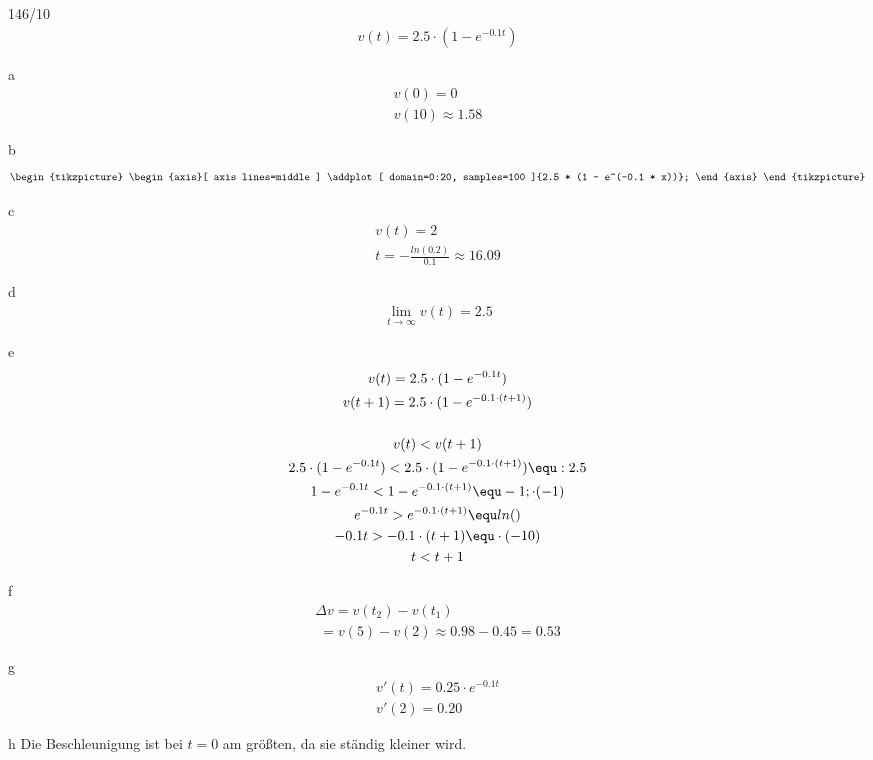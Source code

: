 \begin{exercise}{146/10}
  \begin{gather*}
    v(t) = 2.5 \cdot (1 - e^{-0.1t})
  \end{gather*}
  \item [a]
  \begin{gather*}
    v(0) = 0 \\
    v(10) \approx 1.58
  \end{gather*}
  \item [b]
  \begin{gather*}
    \begin{tikzpicture}
      \begin{axis}[
        axis lines=middle
        ]
        \addplot[
        domain=0:20,
        samples=100
        ]{2.5 * (1 - e^(-0.1 * x))};
      \end{axis}
    \end{tikzpicture}
  \end{gather*}
  \item [c]
  \begin{gather*}
    v(t) = 2 \\
    t = -\frac{ln(0.2)}{0.1} \approx 16.09
  \end{gather*}
  \item [d]
  \begin{gather*}
    \lim\limits_{t \to \infty} v(t) = 2.5
  \end{gather*}
  \item [e]
  \begin{gather*}
    v(t) = 2.5 \cdot (1 - e^{-0.1t}) \\
    v(t + 1) = 2.5 \cdot (1 - e^{-0.1 \cdot (t + 1)}) \\\\
    v(t) < v(t + 1) \\
    2.5 \cdot (1 - e^{-0.1t}) < 2.5 \cdot (1 - e^{-0.1 \cdot (t + 1)}) \equ : 2.5 \\
    1 - e^{-0.1t} < 1 - e^{-0.1 \cdot (t + 1)} \equ - 1; \cdot (-1) \\
    e^{-0.1t} > e^{-0.1 \cdot (t + 1)} \equ ln() \\
    -0.1t > -0.1 \cdot (t + 1) \equ \cdot (-10) \\
    t < t + 1
  \end{gather*}
  \item [f]
  \begin{gather*}
    \Delta v = v(t_2) - v(t_1) \\
    \;= v(5) - v(2) \approx 0.98 - 0.45 = 0.53
  \end{gather*}
  \item [g]
  \begin{gather*}
    v'(t) = 0.25 \cdot e^{-0.1t} \\
    v'(2) = 0.20
  \end{gather*}
  \item [h]
  Die Beschleunigung ist bei $t = 0$ am größten, da sie ständig kleiner wird.
\end{exercise}


